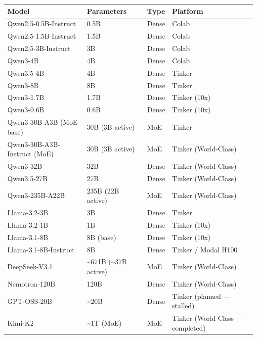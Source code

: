 \documentclass[
  american,
  11pt,
  a4paper,
  oneside]{report}
\newcounter{none} %
\begin{document}
{\def\LTcaptype{none} %
\begin{longtable}[]{@{}
  >{\raggedright\arraybackslash}p{}
  >{\raggedright\arraybackslash}p{}
  >{\raggedright\arraybackslash}p{}
  >{\raggedright\arraybackslash}p{}@{}}
\toprule\noalign{}
\begin{minipage}[b]{\linewidth}\raggedright
Model
\end{minipage} & \begin{minipage}[b]{\linewidth}\raggedright
Parameters
\end{minipage} & \begin{minipage}[b]{\linewidth}\raggedright
Type
\end{minipage} & \begin{minipage}[b]{\linewidth}\raggedright
Platform
\end{minipage} \\
\midrule\noalign{}
\endhead
\bottomrule\noalign{}
\endlastfoot
Qwen2.5-0.5B-Instruct & 0.5B & Dense & Colab \\
Qwen2.5-1.5B-Instruct & 1.5B & Dense & Colab \\
Qwen2.5-3B-Instruct & 3B & Dense & Colab \\
Qwen3-4B & 4B & Dense & Colab \\
Qwen3.5-4B & 4B & Dense & Tinker \\
Qwen3-8B & 8B & Dense & Tinker \\
Qwen3-1.7B & 1.7B & Dense & Tinker (10x) \\
Qwen3-0.6B & 0.6B & Dense & Tinker (10x) \\
Qwen3-30B-A3B (MoE base) & 30B (3B active) & MoE & Tinker \\
Qwen3-30B-A3B-Instruct (MoE) & 30B (3B active) & MoE & Tinker
(World-Class) \\
Qwen3-32B & 32B & Dense & Tinker (World-Class) \\
Qwen3.5-27B & 27B & Dense & Tinker (World-Class) \\
Qwen3-235B-A22B & 235B (22B active) & MoE & Tinker (World-Class) \\
Llama-3.2-3B & 3B & Dense & Tinker \\
Llama-3.2-1B & 1B & Dense & Tinker (10x) \\
Llama-3.1-8B & 8B (base) & Dense & Tinker (10x) \\
Llama-3.1-8B-Instruct & 8B & Dense & Tinker / Modal H100 \\
DeepSeek-V3.1 & \textasciitilde671B (\textasciitilde37B active) & MoE &
Tinker (World-Class) \\
Nemotron-120B & 120B & Dense & Tinker (World-Class) \\
GPT-OSS-20B & \textasciitilde20B & Dense & Tinker (planned ---
stalled) \\
Kimi-K2 & \textasciitilde1T (MoE) & MoE & Tinker (World-Class ---
completed) \\
\end{longtable}
}
\end{document}
